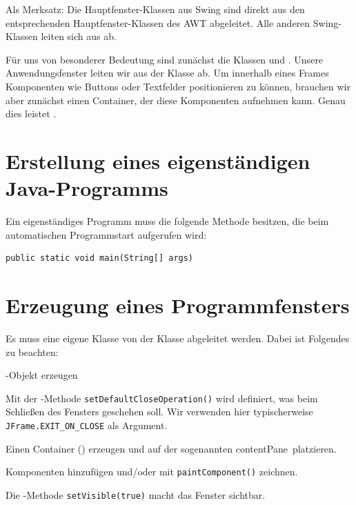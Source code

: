 Als Merksatz: Die Hauptfenster-Klassen aus Swing sind direkt aus den
entsprechenden Hauptfenster-Klassen des AWT abgeleitet. Alle anderen
Swing-Klassen leiten sich aus  ab.

Für uns von besonderer Bedeutung sind zunächst die Klassen  und
. Unsere Anwendungsfenster leiten wir aus der Klasse
 ab. Um innerhalb eines Frames Komponenten wie Buttons oder
Textfelder positionieren zu können, brauchen wir aber zunächst einen Container,
der diese Komponenten aufnehmen kann. Genau dies leistet .


\section{Erstellung eines eigenständigen Java-Programms}

Ein eigenständiges Programm muss die folgende Methode besitzen, die beim
automatischen Programmstart aufgerufen wird:

\begin{lstlisting}
public static void main(String[] args)
\end{lstlisting}


\section{Erzeugung eines Programmfensters}

Es muss eine eigene Klasse von der Klasse  abgeleitet werden.
Dabei ist Folgendes zu beachten:

\begin{compactenum}[1.]
\item {}-Objekt erzeugen

\item Mit der -Methode \lstinline|setDefaultCloseOperation()|
wird definiert, was beim Schließen des Fensters geschehen soll. Wir verwenden
hier typischerweise \lstinline|JFrame.EXIT_ON_CLOSE| als Argument.

\item Einen Container () erzeugen und auf der sogenannten
\glqq contentPane\grqq\ platzieren.

\item Komponenten hinzufügen und/oder mit \lstinline|paintComponent()| zeichnen.

\item Die -Methode \lstinline|setVisible(true)| macht das
Fenster sichtbar.
\end{compactenum}


